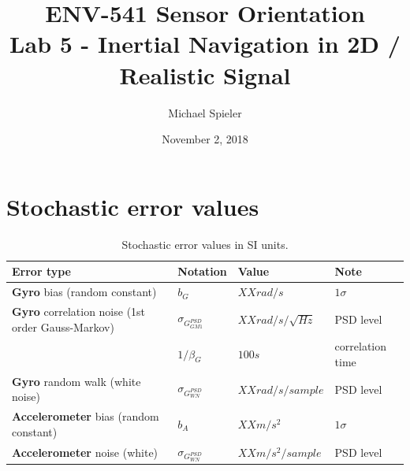 \documentclass{article}
\title{ENV-541 Sensor Orientation\\Lab 5 - Inertial Navigation in 2D / Realistic Signal}
\author{Michael Spieler}
\date{November 2, 2018}
\begin{document}
\maketitle

\section*{Stochastic error values}


\begin{table}[h]
\centering
\begin{tabular}{llll}
Error type & Notation & Value & Note \\
\hline
\textbf{Gyro} bias (random constant) & $b_G$ & $XXrad/s$ & $1\sigma$ \\
\textbf{Gyro} correlation noise (1st order Gauss-Markov) & $\sigma_{G^{PSD}_{GM1}}$ & $XXrad/s/\sqrt{Hz}$ & PSD level \\
& $1/\beta_G$ & $100s$ & correlation time \\
\textbf{Gyro} random walk (white noise) & $\sigma_{G^{PSD}_{WN}}$  & $XXrad/s/sample$ & PSD level \\
\textbf{Accelerometer} bias (random constant) & $b_A$  & $XXm/s^2$ & $1\sigma$ \\
\textbf{Accelerometer} noise (white)  & $\sigma_{G^{PSD}_{WN}}$  & $XXm/s^2/sample$ & PSD level
\end{tabular}
\caption{Stochastic error values in SI units.}
\label{tab:err_val}
\end{table}
\end{document}
